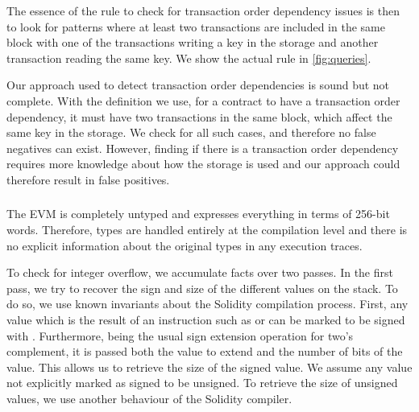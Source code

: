 The essence of the rule to check for transaction order dependency issues is then to look for patterns where at least two transactions are included in the same block with one of the transactions writing a key in the storage and another transaction reading the same key. We show the actual rule in \autoref{fig:queries}.

\correctness Our approach used to detect transaction order dependencies is sound but not complete. With the definition we use, for a contract to have a transaction order dependency, it must have two transactions in the same block, which affect the same key in the storage. We check for all such cases, and therefore no false negatives can exist.
However, finding if there is a transaction order dependency requires more knowledge about how the storage is used and our approach could therefore result in false positives.


\subsubsection{\integeroverflow}
\label{ssec:method-io}

%
The EVM is completely untyped and expresses everything in terms of 256-bit words. Therefore, types are handled entirely at the compilation level and there is no explicit information about the original types in any execution traces.

To check for integer overflow, we accumulate facts over two passes. In the first pass, we try to recover the sign and size of the different values on the stack. To do so, we use known invariants about the Solidity compilation process. First, any value which is the result of an instruction such as  or  can be marked to be signed with . Furthermore,  being the usual sign extension operation for two's complement, it is passed both the value to extend and the number of bits of the value. This allows us to retrieve the size of the signed value. We assume any value not explicitly marked as signed to be unsigned. To retrieve the size of unsigned values, we use another behaviour of the Solidity compiler. 

